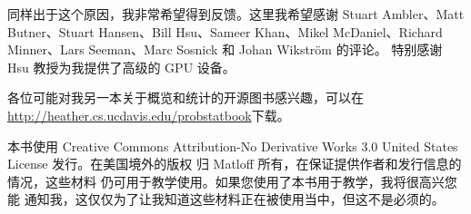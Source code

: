 同样出于这个原因，我非常希望得到反馈。这里我希望感谢 Stuart
Ambler、Matt Butner、Stuart Hansen、Bill Hsu、Sameer Khan、Mikel
McDaniel、Richard Minner、Lars Seeman、Marc Sosnick 和 Johan Wikstr{\"o}m 的评论。
特别感谢 Hsu 教授为我提供了高级的 GPU 设备。

各位可能对我另一本关于概览和统计的开源图书感兴趣，可以在
\url{http://heather.cs.ucdavis.edu/probstatbook}下载。

本书使用 Creative Commons Attribution-No Derivative
Works 3.0 United States License 发行。在美国境外的版权
归 Matloff 所有，在保证提供作者和发行信息的情况，这些材料
仍可用于教学使用。如果您使用了本书用于教学，我将很高兴您能
通知我，这仅仅为了让我知道这些材料正在被使用当中，但这不是必须的。
